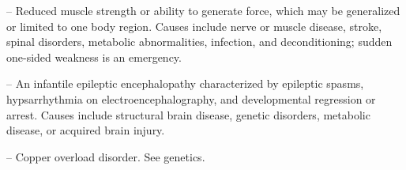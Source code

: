 -- Reduced muscle strength or ability to generate force, which may be generalized or limited to one body region. Causes include nerve or muscle disease, stroke, spinal disorders, metabolic abnormalities, infection, and deconditioning; sudden one-sided weakness is an emergency.

-- An infantile epileptic encephalopathy characterized by epileptic spasms, hypsarrhythmia on electroencephalography, and developmental regression or arrest. Causes include structural brain disease, genetic disorders, metabolic disease, or acquired brain injury.

-- Copper overload disorder. See genetics.
